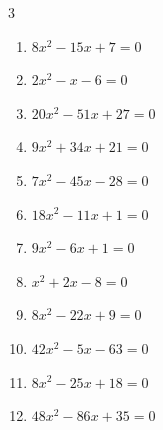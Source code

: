 \begin{multicols}{3}
\begin{enumerate}

\columnbreak %

\resetques

  \item $8x^{2}-15x+7=0$


  \item $2x^{2}-x-6=0$


  \item $20x^{2}-51x+27=0$


  \item $9x^{2}+34x+21=0$


  \item $7x^{2}-45x-28=0$


  \item $18x^{2}-11x+1=0$


  \item $9x^{2}-6x+1=0$


  \item $x^{2}+2x-8=0$

        \phantom{$\displaystyle x=-4,\; 2$}

  \item $8x^{2}-22x+9=0$


  \item $42x^{2}-5x-63=0$


\columnbreak %

  \item $8x^{2}-25x+18=0$


  \item $48x^{2}-86x+35=0$


\end{enumerate}
\end{multicols}
